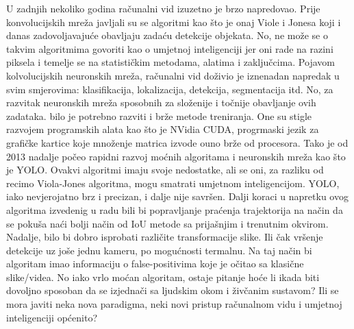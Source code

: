 U zadnjih nekoliko godina računalni vid izuzetno je brzo napredovao. Prije konvolucijskih mreža javljali su se algoritmi kao što je onaj Viole i Jonesa koji i danas zadovoljavajuće obavljaju zadaću detekcije objekata. No, ne može se o takvim algoritmima govoriti kao o umjetnoj inteligenciji jer oni rade na razini piksela i temelje se na statističkim metodama, alatima i zaključcima. Pojavom kolvolucijskih neuronskih mreža, računalni vid doživio je iznenadan napredak u svim smjerovima: klasifikacija, lokalizacija, detekcija, segmentacija itd. No, za razvitak neuronskih mreža sposobnih za složenije i točnije obavljanje ovih zadataka. bilo je potrebno razviti i brže metode treniranja. One su stigle razvojem programskih alata kao što je NVidia CUDA, progrmaski jezik za grafičke kartice koje množenje matrica izvode ouno brže od procesora. Tako je od 2013 nadalje počeo rapidni razvoj moćnih algoritama i neuronskih mreža kao što je YOLO. Ovakvi algoritmi imaju svoje nedostatke, ali se oni, za razliku od recimo Viola-Jones algoritma, mogu smatrati umjetnom inteligencijom. YOLO, iako nevjerojatno brz i precizan, i dalje nije savršen. Dalji koraci u napretku ovog algoritma izvedenig u radu bili bi popravljanje praćenja trajektorija na način da se pokuša naći bolji način od IoU metode sa prijašnjim i trenutnim okvirom. Nadalje, bilo bi dobro isprobati različite transformacije slike. Ili čak vršenje detekcije uz joše jednu kameru, po mogućnosti termalnu. Na taj način bi algoritam imao informaciju o false-positivima koje je očitao sa klasične slike/videa. No iako vrlo moćan algoritam, ostaje pitanje hoće li ikada biti dovoljno sposoban da se izjednači sa ljudskim okom i živčanim sustavom? Ili se mora javiti neka nova paradigma, neki novi pristup računalnom vidu i umjetnoj inteligenciji općenito? 